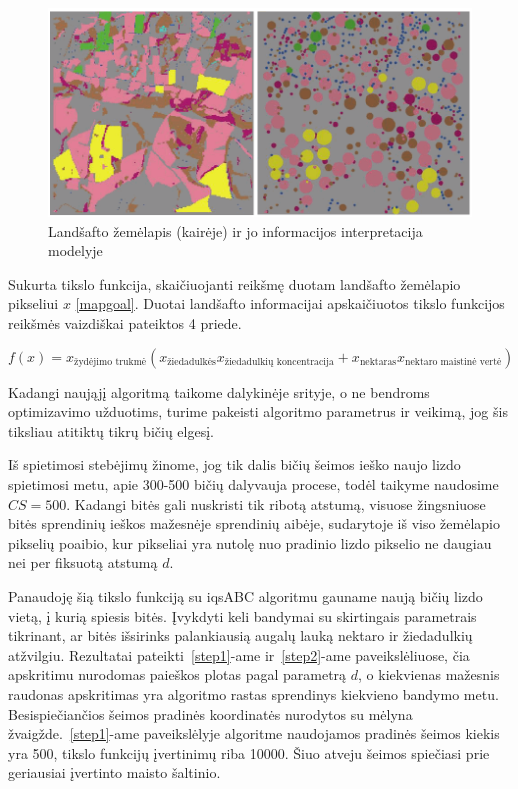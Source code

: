 \documentclass{VUMIFKompMagistrinis}
\begin{document}
\begin{figure}[H]
    \centering
    \includegraphics[scale=0.45]{img/new/maps.png}
    \caption{Landšafto žemėlapis (kairėje) ir jo informacijos interpretacija modelyje}
    \label{img:new1}
\end{figure}

Sukurta tikslo funkcija, skaičiuojanti reikšmę duotam landšafto žemėlapio pikseliui $x$ \eqref{mapgoal}. Duotai landšafto informacijai apskaičiuotos tikslo funkcijos reikšmės vaizdiškai pateiktos 4 priede. 

\begin{equation}\label{mapgoal}
f(x) = x_{\text{žydėjimo trukmė}}  (x_{\text{žiedadulkės}}x_{\text{žiedadulkių koncentracija}} + x_{\text{nektaras}}x_{\text{nektaro maistinė vertė}} ) 
\end{equation}





Kadangi naująjį algoritmą taikome dalykinėje srityje, o ne bendroms optimizavimo užduotims, turime pakeisti algoritmo parametrus ir veikimą, jog šis tiksliau atitiktų tikrų bičių elgesį. 

Iš spietimosi stebėjimų \cite{See10} žinome, jog tik dalis bičių šeimos ieško naujo lizdo spietimosi metu, apie 300-500 bičių dalyvauja procese, todėl taikyme naudosime $CS=500$. Kadangi bitės gali nuskristi tik ribotą atstumą, visuose žingsniuose bitės sprendinių ieškos mažesnėje sprendinių aibėje, sudarytoje iš viso žemėlapio pikselių poaibio, kur pikseliai yra nutolę nuo pradinio lizdo pikselio ne daugiau nei per fiksuotą atstumą $d$.

Panaudoję šią tikslo funkciją su iqsABC algoritmu gauname naują bičių lizdo vietą, į kurią spiesis bitės. Įvykdyti keli bandymai su skirtingais parametrais tikrinant, ar bitės išsirinks palankiausią augalų lauką nektaro ir žiedadulkių atžvilgiu. Rezultatai pateikti~\ref{step1}-ame ir~\ref{step2}-ame paveikslėliuose, čia apskritimu nurodomas paieškos plotas pagal parametrą $d$, o kiekvienas mažesnis raudonas apskritimas yra algoritmo rastas sprendinys kiekvieno bandymo metu. Besispiečiančios šeimos pradinės koordinatės nurodytos su mėlyna žvaigžde.~\ref{step1}-ame paveikslėlyje algoritme naudojamos pradinės šeimos kiekis yra 500, tikslo funkcijų įvertinimų riba 10000. Šiuo atveju šeimos spiečiasi prie geriausiai įvertinto maisto šaltinio.
\end{document}
